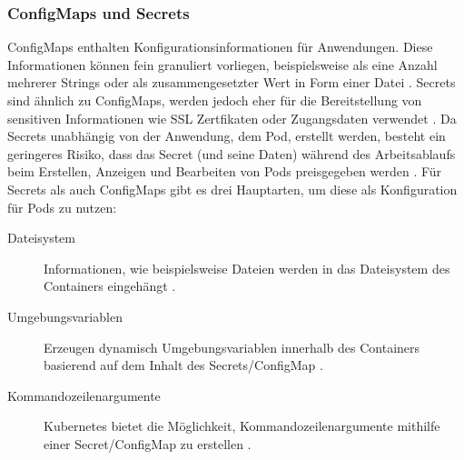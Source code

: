 \subsubsection{ConfigMaps und Secrets}
\label{subsec:kubernetes:configmap_secret}
ConfigMaps enthalten Konfigurationsinformationen für Anwendungen. 
Diese Informationen können fein granuliert vorliegen, beispielsweise als eine Anzahl mehrerer Strings
oder als zusammengesetzter Wert in Form einer Datei \cite{Burns2019}.
Secrets sind ähnlich zu ConfigMaps, werden jedoch eher für die Bereitstellung von sensitiven Informationen wie
SSL Zertfikaten oder Zugangsdaten verwendet \cite{Burns2019}.
Da Secrets unabhängig von der Anwendung, dem Pod, erstellt werden,
besteht ein geringeres Risiko, dass das Secret (und seine Daten) während des Arbeitsablaufs 
beim Erstellen, Anzeigen und Bearbeiten von Pods preisgegeben werden \cite{kubernetesSecrets}. 
Für Secrets als auch ConfigMaps gibt es drei Hauptarten, um diese als Konfiguration für Pods zu nutzen:
\begin{description}
  \item [Dateisystem] Informationen, wie beispielsweise Dateien werden in das Dateisystem des Containers eingehängt \cite{Burns2019}.
  \item [Umgebungsvariablen] Erzeugen dynamisch Umgebungsvariablen innerhalb des Containers basierend auf dem Inhalt des Secrets/ConfigMap \cite{Burns2019}.
  \item [Kommandozeilenargumente] Kubernetes bietet die Möglichkeit, Kommandozeilenargumente mithilfe einer Secret/ConfigMap zu erstellen \cite{Burns2019}.
\end{description}